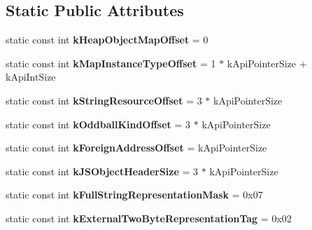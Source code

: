 \subsection*{Static Public Attributes}
\begin{DoxyCompactItemize}
\item 
\hypertarget{classv8_1_1internal_1_1_internals_a0902a596b5656b4592157eaacc020512}{}static const int {\bfseries k\+Heap\+Object\+Map\+Offset} = 0\label{classv8_1_1internal_1_1_internals_a0902a596b5656b4592157eaacc020512}

\item 
\hypertarget{classv8_1_1internal_1_1_internals_a39ea290dfaa9de300bd79aa73a874a88}{}static const int {\bfseries k\+Map\+Instance\+Type\+Offset} = 1 $\ast$ k\+Api\+Pointer\+Size + k\+Api\+Int\+Size\label{classv8_1_1internal_1_1_internals_a39ea290dfaa9de300bd79aa73a874a88}

\item 
\hypertarget{classv8_1_1internal_1_1_internals_a8c2b35069864f567ca0c571310dd90a1}{}static const int {\bfseries k\+String\+Resource\+Offset} = 3 $\ast$ k\+Api\+Pointer\+Size\label{classv8_1_1internal_1_1_internals_a8c2b35069864f567ca0c571310dd90a1}

\item 
\hypertarget{classv8_1_1internal_1_1_internals_a98685d6861a07139720cd296f94f2b73}{}static const int {\bfseries k\+Oddball\+Kind\+Offset} = 3 $\ast$ k\+Api\+Pointer\+Size\label{classv8_1_1internal_1_1_internals_a98685d6861a07139720cd296f94f2b73}

\item 
\hypertarget{classv8_1_1internal_1_1_internals_ad4134449ee39b95e5ac035996aa7d66b}{}static const int {\bfseries k\+Foreign\+Address\+Offset} = k\+Api\+Pointer\+Size\label{classv8_1_1internal_1_1_internals_ad4134449ee39b95e5ac035996aa7d66b}

\item 
\hypertarget{classv8_1_1internal_1_1_internals_af8faf3ff3271d26bafa6ca0ea87e2a57}{}static const int {\bfseries k\+J\+S\+Object\+Header\+Size} = 3 $\ast$ k\+Api\+Pointer\+Size\label{classv8_1_1internal_1_1_internals_af8faf3ff3271d26bafa6ca0ea87e2a57}

\item 
\hypertarget{classv8_1_1internal_1_1_internals_a5c39a86b30463928ea719def66916507}{}static const int {\bfseries k\+Full\+String\+Representation\+Mask} = 0x07\label{classv8_1_1internal_1_1_internals_a5c39a86b30463928ea719def66916507}

\item 
\hypertarget{classv8_1_1internal_1_1_internals_a73faf917416d2519b65c7255e77a74ce}{}static const int {\bfseries k\+External\+Two\+Byte\+Representation\+Tag} = 0x02\label{classv8_1_1internal_1_1_internals_a73faf917416d2519b65c7255e77a74ce}


\end{DoxyCompactItemize}
